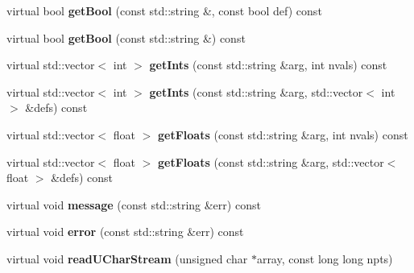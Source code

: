 \begin{DoxyCompactItemize}
virtual bool {\bfseries get\+Bool} (const std\+::string \&, const bool def) const
\item 
\mbox{\label{class_s_e_p_1_1sep_reg_file_a5047831d78459ca1708db87031afd0b3}} 
virtual bool {\bfseries get\+Bool} (const std\+::string \&) const
\item 
\mbox{\label{class_s_e_p_1_1sep_reg_file_ac8d037281167c788b101839b3eac57d5}} 
virtual std\+::vector$<$ int $>$ {\bfseries get\+Ints} (const std\+::string \&arg, int nvals) const
\item 
\mbox{\label{class_s_e_p_1_1sep_reg_file_a43c7fd3106aa037b8ba64f360f38296e}} 
virtual std\+::vector$<$ int $>$ {\bfseries get\+Ints} (const std\+::string \&arg, std\+::vector$<$ int $>$ \&defs) const
\item 
\mbox{\label{class_s_e_p_1_1sep_reg_file_ac3290c205eccb82448a8e96a247bae2f}} 
virtual std\+::vector$<$ float $>$ {\bfseries get\+Floats} (const std\+::string \&arg, int nvals) const
\item 
\mbox{\label{class_s_e_p_1_1sep_reg_file_a632da49089ac5583f3a02a62ab3b2849}} 
virtual std\+::vector$<$ float $>$ {\bfseries get\+Floats} (const std\+::string \&arg, std\+::vector$<$ float $>$ \&defs) const
\item 
\mbox{\label{class_s_e_p_1_1sep_reg_file_ad02aad6a65ca97041dd7a962d2dd05e2}} 
virtual void {\bfseries message} (const std\+::string \&err) const
\item 
\mbox{\label{class_s_e_p_1_1sep_reg_file_a17f5b1cf775b03ee8a901f01e09ab600}} 
virtual void {\bfseries error} (const std\+::string \&err) const
\item 
\mbox{\label{class_s_e_p_1_1sep_reg_file_aa2387be3e795c25a44382297e8c6f419}} 
virtual void {\bfseries read\+U\+Char\+Stream} (unsigned char $\ast$array, const long long npts)
\item 
\mbox{\label{class_s_e_p_1_1sep_reg_file_ae5385c43fb5a91f2282c7fecef5ef1a9}} 

\end{DoxyCompactItemize}
